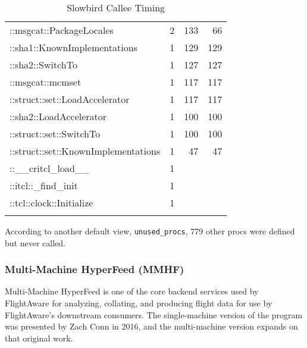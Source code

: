 \documentclass{article}[letter,10pt]
\begin{document}
{{{{\begin{longtable}{l r r r}
          ::msgcat::PackageLocales & 2 & 133 & 66 \\
          ::sha1::KnownImplementations & 1 & 129 & 129 \\
          ::sha2::SwitchTo & 1 & 127 & 127 \\
          ::msgcat::mcmset & 1 & 117 & 117 \\
          ::struct::set::LoadAccelerator & 1 & 117 & 117 \\
          ::sha2::LoadAccelerator & 1 & 100 & 100 \\
          ::struct::set::SwitchTo & 1 & 100 & 100 \\
          ::struct::set::KnownImplementations & 1 & 47 & 47 \\
          ::\_\_critcl\_load\_\_ & 1 &  &  \\
          ::itcl::\_find\_init & 1 &  &  \\
          ::tcl::clock::Initialize & 1 &  & \\
          \bottomrule
          \caption{Slowbird Callee Timing}
          \label{tbl:slowbirdt}
        \end{longtable}}
        According to another default view, \texttt{unused\_procs}, 779 other procs were defined but never called.

    }

    \subsubsection{Multi-Machine HyperFeed (MMHF)}{
      Multi-Machine HyperFeed is one of the core backend services used by FlightAware for analyzing, collating, and producing
      flight data for use by FlightAware's downstream consumers. The single-machine version of the program was presented
      by Zach Conn in 2016\autocite{hyperfeed}, and the multi-machine version expands on that original work.

}}}
\end{document}
